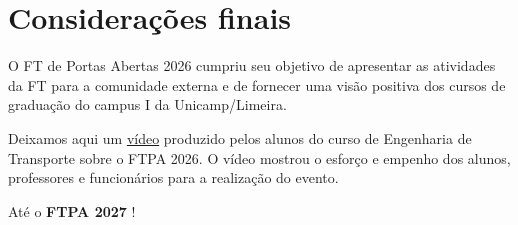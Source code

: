 \documentclass[
  letterpaper,
  DIV=11,
  numbers=noendperiod]{scrreprt}
\begin{document}
\chapter{Considerações finais}\label{considerauxe7uxf5es-finais-1}

O FT de Portas Abertas 2026 cumpriu seu objetivo de apresentar as
atividades da FT para a comunidade externa e de fornecer uma visão
positiva dos cursos de graduação do campus I da Unicamp/Limeira.

Deixamos aqui um
\href{https://www.instagram.com/reel/DbJi3ppBLP5/?igsh=ZHVxM3NiZDBveHMz}{vídeo}
produzido pelos alunos do curso de Engenharia de Transporte sobre o FTPA
2026. O vídeo mostrou o esforço e empenho dos alunos, professores e
funcionários para a realização do evento.

Até o \textbf{FTPA 2027} !
\end{document}
